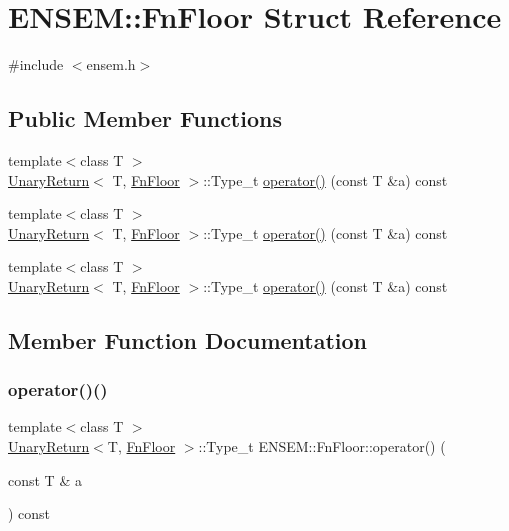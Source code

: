 \hypertarget{structENSEM_1_1FnFloor}{}\section{E\+N\+S\+EM\+:\+:Fn\+Floor Struct Reference}
\label{structENSEM_1_1FnFloor}


{\ttfamily \#include $<$ensem.\+h$>$}

\subsection*{Public Member Functions}
\begin{DoxyCompactItemize}
\item 
{\footnotesize template$<$class T $>$ }\\\mbox{\hyperlink{structENSEM_1_1UnaryReturn}{Unary\+Return}}$<$ T, \mbox{\hyperlink{structENSEM_1_1FnFloor}{Fn\+Floor}} $>$\+::Type\+\_\+t \mbox{\hyperlink{structENSEM_1_1FnFloor_a4452d47aaa4edbfb7644f14a1b3e55f0}{operator()}} (const T \&a) const
\item 
{\footnotesize template$<$class T $>$ }\\\mbox{\hyperlink{structENSEM_1_1UnaryReturn}{Unary\+Return}}$<$ T, \mbox{\hyperlink{structENSEM_1_1FnFloor}{Fn\+Floor}} $>$\+::Type\+\_\+t \mbox{\hyperlink{structENSEM_1_1FnFloor_a4452d47aaa4edbfb7644f14a1b3e55f0}{operator()}} (const T \&a) const
\item 
{\footnotesize template$<$class T $>$ }\\\mbox{\hyperlink{structENSEM_1_1UnaryReturn}{Unary\+Return}}$<$ T, \mbox{\hyperlink{structENSEM_1_1FnFloor}{Fn\+Floor}} $>$\+::Type\+\_\+t \mbox{\hyperlink{structENSEM_1_1FnFloor_a4452d47aaa4edbfb7644f14a1b3e55f0}{operator()}} (const T \&a) const
\end{DoxyCompactItemize}


\subsection{Member Function Documentation}
\mbox{\label{structENSEM_1_1FnFloor_a4452d47aaa4edbfb7644f14a1b3e55f0}} 
\subsubsection{\texorpdfstring{operator()()}{operator()()}\hspace{0.1cm}{\footnotesize\ttfamily [1/3]}}
{\footnotesize\ttfamily template$<$class T $>$ \\
\mbox{\hyperlink{structENSEM_1_1UnaryReturn}{Unary\+Return}}$<$T, \mbox{\hyperlink{structENSEM_1_1FnFloor}{Fn\+Floor}} $>$\+::Type\+\_\+t E\+N\+S\+E\+M\+::\+Fn\+Floor\+::operator() (\begin{DoxyParamCaption}\item[{const T \&}]{a }\end{DoxyParamCaption}) const\hspace{0.3cm}{\ttfamily [inline]}}

